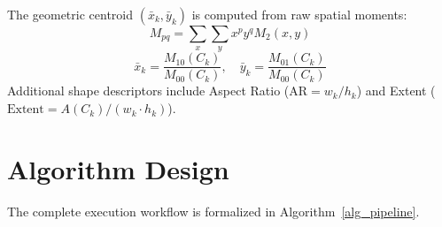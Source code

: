 \documentclass[conference]{IEEEtran}
\begin{document}
The geometric centroid $(\bar{x}_k, \bar{y}_k)$ is computed from raw spatial moments:
\begin{equation}
M_{pq} = \sum_{x} \sum_{y} x^p y^q M_2(x, y)
\end{equation}
\begin{equation}
\bar{x}_k = \frac{M_{10}(C_k)}{M_{00}(C_k)}, \quad \bar{y}_k = \frac{M_{01}(C_k)}{M_{00}(C_k)}
\end{equation}
Additional shape descriptors include Aspect Ratio ($\text{AR} = w_k / h_k$) and Extent ($\text{Extent} = A(C_k) / (w_k \cdot h_k)$).

\section{Algorithm Design}

The complete execution workflow is formalized in Algorithm~\ref{alg_pipeline}.
\end{document}
